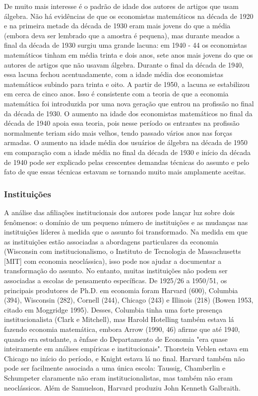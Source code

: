 \documentclass[12pt]{article}
\begin{document}
De muito mais interesse é o padrão de idade dos autores de artigos que usam álgebra. Não há evidências de que os economistas matemáticos na década de 1920 e na primeira metade da década de 1930 eram mais jovens do que a média (embora deva ser lembrado que a amostra é pequena), mas durante meados a final da década de 1930 surgiu uma grande lacuna: em 1940 - 44 os economistas matemáticos tinham em média trinta e dois anos, sete anos mais jovens do que os autores de artigos que não usavam álgebra. Durante o final da década de 1940, essa lacuna fechou acentuadamente, com a idade média dos economistas matemáticos subindo para trinta e oito. A partir de 1950, a lacuna se estabilizou em cerca de cinco anos. Isso é consistente com a teoria de que a economia matemática foi introduzida por uma nova geração que entrou na profissão no final da década de 1930. O aumento na idade dos economistas matemáticos no final da década de 1940 apoia essa teoria, pois nesse período os entrantes na profissão normalmente teriam sido mais velhos, tendo passado vários anos nas forças armadas. O aumento na idade média dos usuários de álgebra na década de 1950 em comparação com a idade média no final da década de 1930 e início da década de 1940 pode ser explicado pelas crescentes demandas técnicas do assunto e pelo fato de que essas técnicas estavam se tornando muito mais amplamente aceitas.

\subsubsection{\textbf{Instituições}}
A análise das afiliações institucionais dos autores pode lançar luz sobre dois fenômenos: o domínio de um pequeno número de instituições e as mudanças nas instituições líderes à medida que o assunto foi transformado. Na medida em que as instituições estão associadas a abordagens particulares da economia (Wisconsin com institucionalismo, o Instituto de Tecnologia de Massachusetts [MIT] com economia neoclássica), isso pode nos ajudar a documentar a transformação do assunto. No entanto, muitas instituições não podem ser associadas a escolas de pensamento específicas. De 1925/26 a 1950/51, os principais produtores de Ph.D. em economia foram Harvard (600), Columbia (394), Wisconsin (282), Cornell (244), Chicago (243) e Illinois (218) (Bowen 1953, citado em Moggridge 1995). Desses, Columbia tinha uma forte presença institucionalista (Clark e Mitchell), mas Harold Hotelling também estava lá fazendo economia matemática, embora Arrow (1990, 46) afirme que até 1940, quando era estudante, a ênfase do Departamento de Economia "era quase inteiramente em análises empíricas e institucionais". Thorstein Veblen estava em Chicago no início do período, e Knight estava lá no final. Harvard também não pode ser facilmente associada a uma única escola: Taussig, Chamberlin e Schumpeter claramente não eram institucionalistas, mas também não eram neoclássicos. Além de Samuelson, Harvard produziu John Kenneth Galbraith.
\end{document}
